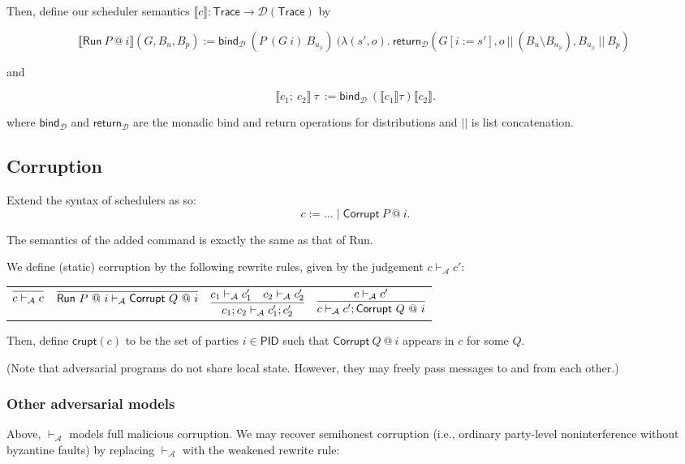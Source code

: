 \documentclass{article}
\newcommand{\PID}{\mathsf{PID}}
\newcommand{\D}{\mathcal{D}}
\begin{document}
Then, define our scheduler semantics $\llbracket c \rrbracket : \textsf{Trace} \to \D(\textsf{Trace})$ by

\[\llbracket \textsf{Run}\ P\ @\ i \rrbracket (G, B_u, B_p) := \textsf{bind}_{\D}\ (P\ (G\ i)\ B_{u_{| i}})\ (\lambda (s', o).\ \textsf{return}_{\D} (G[i := s'], o\ ||\ (B_u \setminus B_{u_{| i}}), B_{u_{| i}}\ ||\ B_p)\ \]

and

\[\llbracket c_1;\ c_2 \rrbracket\ \tau\ := \textsf{bind}_{\D}\ (\llbracket c_1 \rrbracket \tau) \llbracket c_2 \rrbracket.\]

where $\textsf{bind}_{\D}$ and $\textsf{return}_{\D}$ are the monadic bind and return operations for distributions and $||$ is list concatenation.

\subsection{Corruption}

Extend the syntax of schedulers as so:
\[ c := \dots \mid \textsf{Corrupt}\ P\ @\ i.\]

The semantics of the added command is exactly the same as that of \textsf{Run}.

We define (static) corruption by the following rewrite rules, given by the judgement $c \vdash_{\mathcal{A}} c'$:

\begin{tabular}{cccc}
    $\infer{c \vdash_{\mathcal{A}} c}{}$ & 
    $\infer{\textsf{Run}\ P\ @\ i \vdash_{\mathcal{A}} \textsf{Corrupt}\ Q\ @\ i}{}$ &
    $\infer{c_1;c_2 \vdash_{\mathcal{A}} c_1'; c_2'} {c_1 \vdash_\mathcal{A} c_1' & c_2 \vdash_\mathcal{A} c_2'}$ &
    $\infer{c \vdash_{\mathcal{A}} c'; \textsf{Corrupt}\ Q\ @\ i}{c \vdash_\mathcal{A} c'}$ \\
\end{tabular}

Then, define $\mathsf{crupt}(c)$ to be the set of parties $i \in \PID$ such that $\textsf{Corrupt}\ Q\ @\ i$ appears in $c$ for some $Q$.

(Note that adversarial programs do not share local state. However, they may freely pass messages to and from each other.)

\subsubsection{Other adversarial models}

Above, $\vdash_\mathcal{A}$ models full malicious corruption. We may recover semihonest corruption (i.e., ordinary party-level noninterference without byzantine faults) by replacing $\vdash_\mathcal{A}$ with the weakened rewrite rule:
\end{document}
